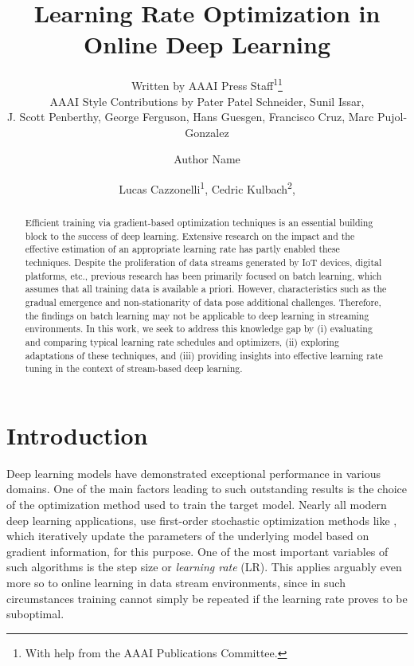 \documentclass[letterpaper]{article} %
\author{
    Written by AAAI Press Staff\textsuperscript{\rm 1}\thanks{With help from the AAAI Publications Committee.}\\
    AAAI Style Contributions by Pater Patel Schneider,
    Sunil Issar,\\
    J. Scott Penberthy,
    George Ferguson,
    Hans Guesgen,
    Francisco Cruz\equalcontrib,
    Marc Pujol-Gonzalez\equalcontrib}
\author{
    Author Name
}
\title{Learning Rate Optimization in Online Deep Learning}
\author{
    Lucas Cazzonelli\textsuperscript{\rm 1},
    Cedric Kulbach\textsuperscript{\rm 2},
}
\begin{document}
\maketitle


\begin{abstract}
	\noindent Efficient training via gradient-based optimization techniques is an essential building block to the success of deep learning. Extensive research on the impact and the effective estimation of an appropriate learning rate has partly enabled these techniques. Despite the proliferation of data streams generated by IoT devices, digital platforms, etc., previous research has been primarily focused on batch learning, which assumes that all training data is available a priori. However, characteristics such as the gradual emergence and non-stationarity of data pose additional challenges. Therefore, the findings on batch learning may not be applicable to deep learning in streaming environments. In this work, we seek to address this knowledge gap by (i) evaluating and comparing typical learning rate schedules and optimizers, (ii) exploring adaptations of these techniques, and (iii) providing insights into effective learning rate tuning in the context of stream-based deep learning.
\end{abstract}

\section{Introduction}
Deep learning models have demonstrated exceptional performance in various domains.
One of the main factors leading to such outstanding results is the choice of the optimization method used to train the target model.
Nearly all modern deep learning applications, use first-order stochastic optimization methods like , which iteratively update the parameters of the underlying model based on gradient information, for this purpose.
One of the most important variables of such algorithms is the step size or \textit{learning rate} (LR).
This applies arguably even more so to online learning in data stream environments, since in such circumstances training cannot simply be repeated if the learning rate proves to be suboptimal.
\end{document}
